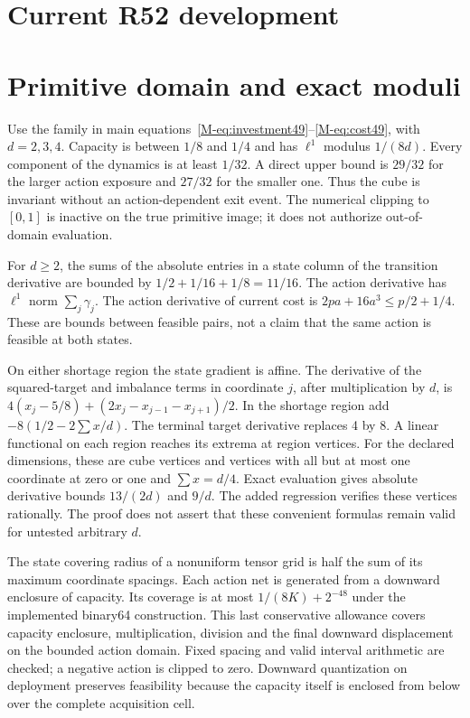 \documentclass[ecta,nameyear,draft]{econsocart}
\begin{document}
\section*{Current R52 development}
\section{Primitive domain and exact moduli}\label{supp:primitive49}
Use the family in main equations~\eqref{M-eq:investment49}--\eqref{M-eq:cost49}, with $d=2,3,4$. Capacity is between $1/8$ and $1/4$ and has $\ell^1$ modulus $1/(8d)$. Every component of the dynamics is at least $1/32$. A direct upper bound is $29/32$ for the larger action exposure and $27/32$ for the smaller one. Thus the cube is invariant without an action-dependent exit event. The numerical clipping to $[0,1]$ is inactive on the true primitive image; it does not authorize out-of-domain evaluation.

For $d\ge2$, the sums of the absolute entries in a state column of the transition derivative are bounded by $1/2+1/16+1/8=11/16$. The action derivative has $\ell^1$ norm $\sum_j\gamma_j$. The action derivative of current cost is $2pa+16a^3\le p/2+1/4$. These are bounds between feasible pairs, not a claim that the same action is feasible at both states.

On either shortage region the state gradient is affine. The derivative of the squared-target and imbalance terms in coordinate $j$, after multiplication by $d$, is $4(x_j-5/8)+(2x_j-x_{j-1}-x_{j+1})/2$. In the shortage region add $-8(1/2-2\sum x/d)$. The terminal target derivative replaces 4 by 8. A linear functional on each region reaches its extrema at region vertices. For the declared dimensions, these are cube vertices and vertices with all but at most one coordinate at zero or one and $\sum x=d/4$. Exact evaluation gives absolute derivative bounds $13/(2d)$ and $9/d$. The added regression verifies these vertices rationally. The proof does not assert that these convenient formulas remain valid for untested arbitrary $d$.

The state covering radius of a nonuniform tensor grid is half the sum of its maximum coordinate spacings. Each action net is generated from a downward enclosure of capacity. Its coverage is at most $1/(8K)+2^{-48}$ under the implemented binary64 construction. This last conservative allowance covers capacity enclosure, multiplication, division and the final downward displacement on the bounded action domain. Fixed spacing and valid interval arithmetic are checked; a negative action is clipped to zero. Downward quantization on deployment preserves feasibility because the capacity itself is enclosed from below over the complete acquisition cell.
\end{document}
